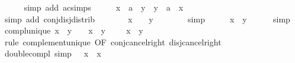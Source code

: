 \begin{isabellebody}
\ \ \ \ \isamarkupfalse%
\ {\isacharparenleft}{\kern0pt}simp\ add{\isacharcolon}{\kern0pt}\ ac{\isacharunderscore}{\kern0pt}simps{\isacharparenright}{\kern0pt}\isanewline
\ \ \isamarkupfalse%
\ \isamarkupfalse%
\ {\isachardoublequoteopen}x\ \isactrlbold {\isasymsqinter}\ {\isacharparenleft}{\kern0pt}a\ \isactrlbold {\isasymsqunion}\ y{\isacharparenright}{\kern0pt}\ {\isacharequal}{\kern0pt}\ y\ \isactrlbold {\isasymsqinter}\ {\isacharparenleft}{\kern0pt}a\ \isactrlbold {\isasymsqunion}\ x{\isacharparenright}{\kern0pt}{\isachardoublequoteclose}\isanewline
\ \ \ \ \isamarkupfalse%
\ {\isacharparenleft}{\kern0pt}simp\ add{\isacharcolon}{\kern0pt}\ conj{\isacharunderscore}{\kern0pt}disj{\isacharunderscore}{\kern0pt}distrib{\isacharparenright}{\kern0pt}\isanewline
\ \ \isamarkupfalse%
\ {}\ {}\ \isamarkupfalse%
\ {\isachardoublequoteopen}x\ \isactrlbold {\isasymsqinter}\ \ {\isacharequal}{\kern0pt}\ y\ \isactrlbold {\isasymsqinter}\ \isanewline
\ \ \ \ \isamarkupfalse%
\ simp\isanewline
\ \ \isamarkupfalse%
\ \isamarkupfalse%
\ {\isachardoublequoteopen}x\ {\isacharequal}{\kern0pt}\ y{\isachardoublequoteclose}\isanewline
\ \ \ \ \isamarkupfalse%
\ simp\isanewline
{}\isamarkupfalse%
%
\endisatagproof
{\isafoldproof}%
%
\isadelimproof
\isanewline
%
\endisadelimproof
\isanewline
{}\isamarkupfalse%
\ compl{\isacharunderscore}{\kern0pt}unique{\isacharcolon}{\kern0pt}\ {\isachardoublequoteopen}x\ \isactrlbold {\isasymsqinter}\ y\ {\isacharequal}{\kern0pt}\ \ {\isasymLongrightarrow}\ x\ \isactrlbold {\isasymsqunion}\ y\ {\isacharequal}{\kern0pt}\ \ {\isasymLongrightarrow}\ \isactrlbold {\isacharminus}{\kern0pt}\ x\ {\isacharequal}{\kern0pt}\ y{\isachardoublequoteclose}\isanewline
%
\isadelimproof
\ \ %
\endisadelimproof
%
\isatagproof
{}\isamarkupfalse%
\ {\isacharparenleft}{\kern0pt}rule\ complement{\isacharunderscore}{\kern0pt}unique\ {\isacharbrackleft}{\kern0pt}OF\ conj{\isacharunderscore}{\kern0pt}cancel{\isacharunderscore}{\kern0pt}right\ disj{\isacharunderscore}{\kern0pt}cancel{\isacharunderscore}{\kern0pt}right{\isacharbrackright}{\kern0pt}{\isacharparenright}{\kern0pt}%
\endisatagproof
{\isafoldproof}%
%
\isadelimproof
\isanewline
%
\endisadelimproof
\isanewline
{}\isamarkupfalse%
\ double{\isacharunderscore}{\kern0pt}compl\ {\isacharbrackleft}{\kern0pt}simp{\isacharbrackright}{\kern0pt}{\isacharcolon}{\kern0pt}\ {\isachardoublequoteopen}\isactrlbold {\isacharminus}{\kern0pt}\ {\isacharparenleft}{\kern0pt}\isactrlbold {\isacharminus}{\kern0pt}\ x{\isacharparenright}{\kern0pt}\ {\isacharequal}{\kern0pt}\ x{\isachardoublequoteclose}\isanewline

\end{isabellebody}
